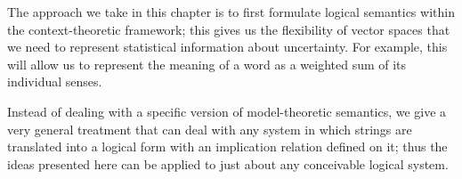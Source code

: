 
The approach we take in this chapter is to first formulate logical semantics within the context-theoretic framework; this gives us the flexibility of vector spaces that we need to represent statistical information about uncertainty. For example, this will allow us to represent the meaning of a word as a weighted sum of its individual senses.

Instead of dealing with a specific version of model-theoretic semantics, we give a very general treatment that can deal with any system in which strings are translated into a logical form with an implication relation defined on it; thus the ideas presented here can be applied to just about any conceivable logical system.

